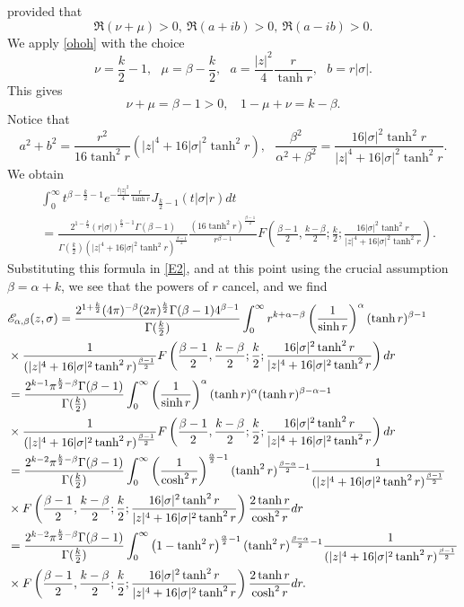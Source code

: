 \documentclass[11pt,a4paper]{amsart}
\def \G{\Gamma}
\numberwithin{equation}{section}
\numberwithin{equation}{section}
\begin{document}
provided that
\[
\Re(\nu+\mu)>0,\ \Re(a+i b)>0,\ \Re(a-i b)>0.
\]
We apply \eqref{ohoh} with the choice
\[
\nu = \frac k2 -1,\ \ \ \mu = \beta - \frac k2,\ \ \ a = \frac{|z|^2}{4} \frac{r}{\tanh r},\ \ \ b = r |\sigma|.
\]
This gives
\[
\nu + \mu = \beta-1>0,\ \ \ \ 1-\mu+\nu = k-\beta.
\]
Notice that
\[
a^2 + b^2 = \frac{r^2}{16 \tanh^2 r} (|z|^4 + 16 |\sigma|^2 \tanh^2 r),\ \ \ \frac{\beta^2}{\alpha^2 + \beta^2} = \frac{16 |\sigma|^2 \tanh^2 r}{|z|^4 + 16 |\sigma|^2 \tanh^2 r}.
\]
We obtain
\begin{align*}
& \int_0^\infty t^{\beta- \frac k2 -1} e^{- \frac{t |z|^2}{4} \frac{r}{\tanh r}} 
J_{\frac{k}2-1}(t |\sigma| r) dt 
\\
& = \frac{2^{1-\frac k2} (r |\sigma|)^{\frac k2 -1} \G(\beta-1)}{\G(\frac k2) (|z|^4 + 16|\sigma|^2 \tanh^2 r)^{\frac{\beta-1}2}} \frac{(16 \tanh^2 r)^{\frac{\beta-1}2}}{r^{\beta-1}} F\left(\frac{\beta-1}{2},\frac{k-\beta}{2};\frac k2;\frac{16|\sigma|^2 \tanh^2 r}{|z|^4 + 16|\sigma|^2 \tanh^2 r}\right).
\end{align*}
Substituting this formula in \eqref{E2}, and at this point using the crucial assumption $\boxed{\beta = \alpha+k}$, we see that the powers of $r$ cancel, and we find
\begin{align}\label{E3}
& \mathscr E_{\alpha,\beta}(z,\sigma) =  \frac{2^{1+\frac k2} (4\pi)^{-\beta} (2\pi)^{\frac k2}\G(\beta-1)4^{\beta-1}}{\G(\frac k2)} \int_0^\infty r^{k+\alpha-\beta} \left(\frac{1}{\sinh r}\right)^{\alpha} (\tanh r)^{\beta-1}
\\
& \times \frac{1}{ (|z|^4 + 16|\sigma|^2 \tanh^2 r)^{\frac{\beta-1}2}} F\left(\frac{\beta-1}{2},\frac{k-\beta}{2};\frac k2;\frac{16|\sigma|^2 \tanh^2 r}{|z|^4 + 16|\sigma|^2 \tanh^2 r}\right) dr
\notag
\\
& = \frac{2^{k-1} \pi^{\frac k2-\beta}\G(\beta-1)}{\G(\frac k2)} \int_0^\infty \left(\frac{1}{\sinh r}\right)^{\alpha} (\tanh r)^{\alpha}(\tanh r)^{\beta-\alpha-1}
\notag
\\
& \times \frac{1}{ (|z|^4 + 16|\sigma|^2 \tanh^2 r)^{\frac{\beta-1}2}} F\left(\frac{\beta-1}{2},\frac{k-\beta}{2};\frac k2;\frac{16|\sigma|^2 \tanh^2 r}{|z|^4 + 16|\sigma|^2 \tanh^2 r}\right) dr
\notag
\\
& = \frac{2^{k-2} \pi^{\frac k2-\beta}\G(\beta-1)}{\G(\frac k2)} \int_0^\infty \left(\frac{1}{\cosh^2 r}\right)^{\frac{\alpha}2 -1} (\tanh^2 r)^{\frac{\beta-\alpha}{2}-1} \frac{1}{ (|z|^4 + 16|\sigma|^2 \tanh^2 r)^{\frac{\beta-1}2}}
\notag
\\
& \times  F\left(\frac{\beta-1}{2},\frac{k-\beta}{2};\frac k2;\frac{16|\sigma|^2 \tanh^2 r}{|z|^4 + 16|\sigma|^2 \tanh^2 r}\right) \frac{2 \tanh r}{\cosh^2 r} dr
\notag
\\
& = \frac{2^{k-2} \pi^{\frac k2-\beta}\G(\beta-1)}{\G(\frac k2)} \int_0^\infty \left(1-\tanh^2 r\right)^{\frac{\alpha}2 -1} (\tanh^2 r)^{\frac{\beta-\alpha}{2}-1} \frac{1}{ (|z|^4 + 16|\sigma|^2 \tanh^2 r)^{\frac{\beta-1}2}}
\notag
\\
& \times  F\left(\frac{\beta-1}{2},\frac{k-\beta}{2};\frac k2;\frac{16|\sigma|^2 \tanh^2 r}{|z|^4 + 16|\sigma|^2 \tanh^2 r}\right) \frac{2 \tanh r}{\cosh^2 r} dr.
\notag
\end{align}
\end{document}
